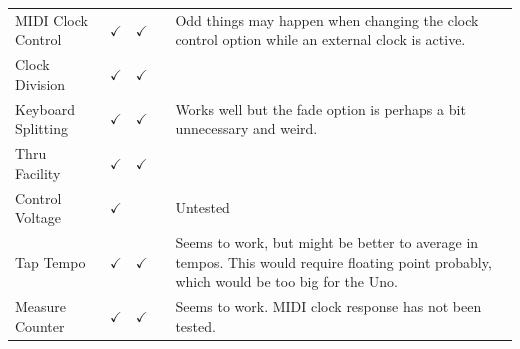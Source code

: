 \documentclass{article}
\begin{document}
\begin{center}
{\begin{tabular}{@{}llllp{2.8in}@{}}
MIDI Clock Control& $\checkmark$ & $\checkmark$ & &Odd things may happen when changing the clock control option while an external clock is active.\\
Clock Division&$\checkmark$&$\checkmark$& &\\
Keyboard Splitting& $\checkmark$ & $\checkmark$  & & Works well but the fade option is perhaps a bit unnecessary and weird.\\
Thru Facility & $\checkmark$ & $\checkmark$ & & \\
Control Voltage& $\checkmark$ & & & Untested\\
Tap Tempo & $\checkmark$ & $\checkmark$& & Seems to work, but might be better to average in tempos.  This would require floating point probably, which would be too big for the Uno.\\
Measure Counter & $\checkmark$ & $\checkmark$& & Seems to work.  MIDI clock response has not been tested.
\end{tabular}
}
\end{center}
\end{document}
